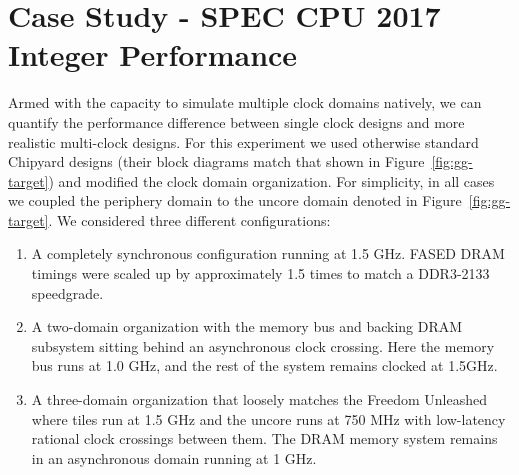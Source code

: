 
\section{Case Study - SPEC CPU 2017 Integer Performance}

Armed with the capacity to simulate multiple clock domains natively, we can
quantify the performance difference between single clock designs and more
realistic multi-clock designs. For this experiment we used otherwise standard
Chipyard designs (their block diagrams match that shown in
Figure~\ref{fig:gg-target}) and modified the clock domain organization. For
simplicity, in all cases we coupled the periphery domain to the uncore domain
denoted in Figure~\ref{fig:gg-target}. We considered three different configurations:

\begin{enumerate}
    \item A completely synchronous configuration running at 1.5 GHz. FASED DRAM timings were scaled up
        by approximately 1.5 times to match a DDR3-2133 speedgrade.
    \item A two-domain organization with the memory bus and backing DRAM subsystem sitting behind
        an asynchronous clock crossing. Here the memory bus runs at 1.0 GHz, and the rest of the system
        remains clocked at 1.5GHz.
    \item A three-domain organization that loosely matches the Freedom
        Unleashed where tiles run at 1.5 GHz and the uncore runs at 750 MHz
        with low-latency rational clock crossings between them. The DRAM memory
        system remains in an asynchronous domain running at 1 GHz.
\end{enumerate}


